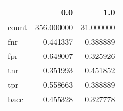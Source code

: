 \begin{tabular}{lrr}
\toprule
{} &         0.0 &        1.0 \\
\midrule
count &  356.000000 &  31.000000 \\
fnr   &    0.441337 &   0.388889 \\
fpr   &    0.648007 &   0.325926 \\
tnr   &    0.351993 &   0.451852 \\
tpr   &    0.558663 &   0.388889 \\
bacc  &    0.455328 &   0.327778 \\
\bottomrule
\end{tabular}
